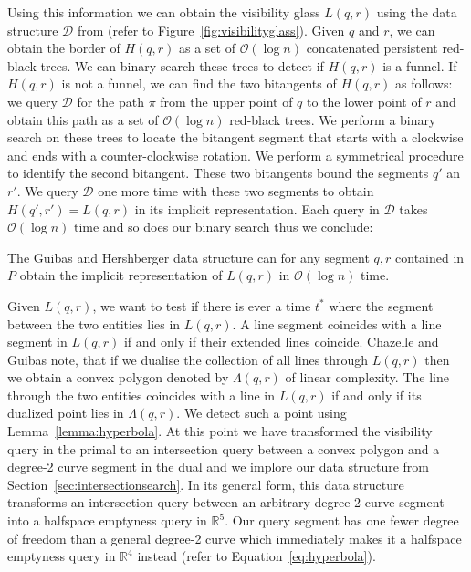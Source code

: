 \documentclass[UKenglish]{lipics-v2019}
\begin{document}
Using this information we can obtain the visibility glass $L(q,r)$ using the data structure $\mathcal{D}$ from \cite{guibas1989optimal} (refer to Figure~\ref{fig:visibilityglass}). Given $q$ and $r$, we can obtain the border of $H(q,r)$ as a set of $\mathcal{O}(\log n)$ concatenated persistent red-black trees. We can binary search these trees to detect if $H(q,r)$ is a funnel. If $H(q,r)$ is not a funnel, we can find the two bitangents of $H(q,r)$ as follows: we query $\mathcal{D}$ for the path $\pi$ from the upper point of $q$ to the lower point of $r$ and obtain this path as a set of $\mathcal{O}(\log n)$ red-black trees. We perform a binary search on these trees to locate the bitangent segment that starts with a clockwise and ends with a counter-clockwise rotation. We perform a symmetrical procedure to identify the second bitangent.
These two bitangents bound the segments $q'$ an $r'$. We query $\mathcal{D}$ one more time with these two segments to obtain $H(q', r') = L(q,r)$ in its implicit representation. Each query in $\mathcal{D}$ takes $\mathcal{O}(\log n)$ time and so does our binary search thus we conclude:

\begin{lemma}
\label{lemma:visibilityquery}
  The Guibas and Hershberger data structure can for any segment $q,r$ contained in $P$ obtain the implicit representation of $L(q,r)$ in $\mathcal{O}(\log n)$ time.
\end{lemma}

 
Given $L(q,r)$, we want to test if there is ever a time $t^*$ where the segment between the two entities lies in $L(q,r)$. A line segment coincides with a line segment in $L(q,r)$ if and only if their extended lines coincide. Chazelle and Guibas \cite{Chazelle1989} note, that if we dualise the collection of all lines through $L(q,r)$ then we obtain a convex polygon denoted by $\Lambda(q,r)$ of linear complexity. The line through the two entities coincides with a line in $L(q,r)$ if and only if its dualized point lies in $\Lambda(q,r)$. We detect such a point using Lemma~\ref{lemma:hyperbola}. 
At this point we have transformed the visibility query in the primal to an intersection query between a convex polygon and a degree-2 curve segment in the dual and we implore our data structure from Section~\ref{sec:intersectionsearch}. In its general form, this data structure transforms an intersection query between an arbitrary degree-2 curve segment into a halfspace emptyness query in $\mathbb{R}^5$. Our query segment has one fewer degree of freedom than a general degree-2 curve which immediately makes it a halfspace emptyness query in $\mathbb{R}^4$ instead (refer to Equation~\ref{eq:hyperbola}).
\end{document}
